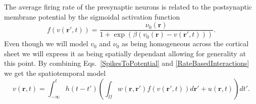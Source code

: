 \documentclass[onecolumn,draftcls]{IEEEtran}
\begin{document}
The average firing rate of the presynaptic neurons is related to the postsynaptic membrane potential by the sigmoidal activation function
\begin{equation}\label{ActivationFunction}
	f\left( v\left( \mathbf{r}', t \right) \right) = \frac{\nu _0\left(\mathbf{r}\right)}{1 + \exp \left( \beta \left( v_0\left( \mathbf{r} \right) - v\left(\mathbf{r}',t\right) \right) \right)}.
\end{equation}
Even though we will model $v_0$ and $\nu_0$ as being homogeneous across the cortical sheet we will express it as being spatially dependant allowing for generality at this point. By combining Eqs.~\ref{SpikesToPotential} and \ref{RateBasedInteractions} we get the spatiotemporal model
\begin{equation}\label{FullDoubleIntModel}
	v\left(\mathbf{r},t\right) = \int_{-\infty}^t h\left(t - t'\right) \left(\int_\Omega   w\left(\mathbf{r},\mathbf{r}'\right) f\left( v\left( \mathbf{r}',t \right)\right)d\mathbf{r}' + u(\mathbf{r},t) \right)dt'.
\end{equation}
\end{document}
